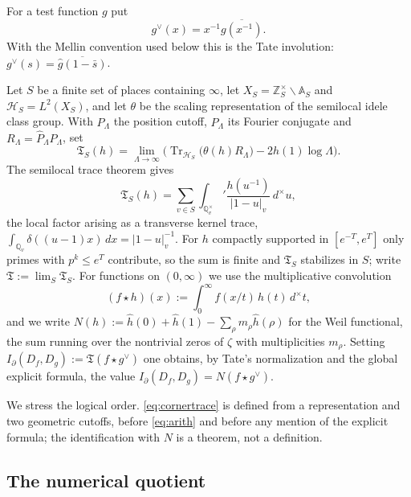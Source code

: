 \documentclass[11pt]{amsart}
\theoremstyle{definition}
\theoremstyle{remark}
\newcommand{\Z}{\mathbb Z}
\newcommand{\Q}{\mathbb Q}
\newcommand{\A}{\mathbb A}
\newcommand{\Tr}{\operatorname{Tr}}
\begin{document}
For a test function $g$ put
\begin{equation}\label{eq:Tateinvolution}
 g^\vee(x)=x^{-1}\overline{g(x^{-1})}.
\end{equation}
With the Mellin convention used below this is the Tate involution:
$\widehat{g^\vee}(s)=\overline{\widehat g(1-\bar s)}$.

Let $S$ be a finite set of places containing $\infty$, let
$X_S=\Z_S^\times\backslash\A_S$ and $\mathcal H_S=L^2(X_S)$, and let $\theta$
be the scaling representation of the semilocal idele class group.  With
$P_\Lambda$ the position cutoff, $\widehat P_\Lambda$ its Fourier conjugate
and $R_\Lambda=\widehat P_\Lambda P_\Lambda$, set
\begin{equation}\label{eq:cornertrace}
 \mathfrak T_S(h)=\lim_{\Lambda\to\infty}
 \Big(\Tr_{\mathcal H_S}\big(\theta(h)R_\Lambda\big)-2h(1)\log\Lambda\Big).
\end{equation}
The semilocal trace theorem \cite{Connes1999,CCJacobian} gives
\begin{equation}\label{eq:arith}
 \mathfrak T_S(h)=\sum_{v\in S}\int_{\Q_v^\times}'
 \frac{h(u^{-1})}{|1-u|_v}\,d^\times u,
\end{equation}
the local factor arising as a transverse kernel trace,
$\int_{\Q_v}\delta((u-1)x)\,dx=|1-u|_v^{-1}$.  For $h$ compactly supported
in $[e^{-T},e^{T}]$ only primes with $p^k\le e^T$ contribute, so the sum is
finite and $\mathfrak T_S$ stabilizes in $S$; write
$\mathfrak T:=\lim_S\mathfrak T_S$.  For functions on $(0,\infty)$ we use
the multiplicative convolution
\[
 (f\star h)(x):=\int_0^\infty f(x/t)\,h(t)\,d^\times t ,
\]
and we write $N(h):=\widehat h(0)+\widehat h(1)-\sum_\rho m_\rho\widehat
h(\rho)$ for the Weil functional, the sum running over the nontrivial zeros
of $\zeta$ with multiplicities $m_\rho$.  Setting
$I_\partial(D_f,D_g):=\mathfrak T(f\star g^\vee)$ one obtains, by Tate's
normalization and the global explicit formula, the value
$I_\partial(D_f,D_g)=N(f\star g^\vee)$.

We stress the logical order.  \eqref{eq:cornertrace} is defined from a
representation and two geometric cutoffs, before \eqref{eq:arith} and before
any mention of the explicit formula; the identification with $N$ is a
theorem, not a definition.

\subsection{The numerical quotient}
\label{subsec:numquot}
\end{document}
